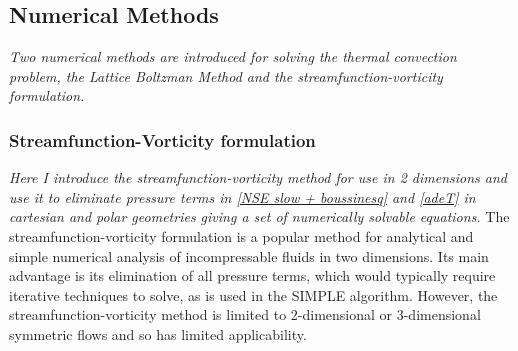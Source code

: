\documentclass{article}
\begin{document}
\subsection*{Numerical Methods}

{\it{Two numerical methods are introduced for solving the thermal convection problem, the Lattice Boltzman Method and the streamfunction-vorticity formulation. }}

\subsubsection*{Streamfunction-Vorticity formulation}
{\it{Here I introduce the streamfunction-vorticity method for use in 2 dimensions and use it to eliminate pressure terms in \ref{NSE slow + boussinesq} and \ref{adeT} in cartesian and polar geometries giving a set of numerically solvable equations.}}
\vspace{0.3cm}
\newline
\noindent The streamfunction-vorticity formulation is a popular method for analytical and simple numerical analysis of incompressable fluids in two dimensions. Its main advantage is its elimination of all pressure terms, which would typically require iterative techniques to solve, as is used in the SIMPLE algorithm. However, the streamfunction-vorticity method is limited to 2-dimensional or 3-dimensional symmetric flows and so has limited applicability.
\end{document}
